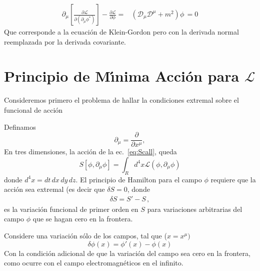 \begin{align}
  \partial_{\mu} \left[ \frac{\partial \mathcal{L}}{\partial \left( \partial_{\mu}\phi^{*} \right)} \right]-\frac{\partial \mathcal{L}}{\partial \phi}=&
 \left(\mathcal{D}_{\mu}\mathcal{D}^{\mu}+m^2  \right)\phi\,=0
\end{align}
Que corresponde a la ecuación de Klein-Gordon pero con la derivada normal reemplazada por la derivada covariante.

\section{Principio de M\'\i nima Acci\'on para $\mathcal{L}$}
\label{sec:principio-de-minima-call}
Consideremos primero el problema de hallar la condiciones extremal sobre el funcional de acción


Definamos
\begin{equation}
  \label{eq:dmu}
  \partial_\mu=\frac{\partial}{\partial x^\mu},
  \end{equation}
En tres dimensiones, la acci\'on de la ec.~\eqref{eq:Scall}, queda
\begin{equation}
  \label{eq:Scall3d}
  S[\phi,\partial_\mu\phi]=\int_{R}d^4x\mathcal{L}(\phi,\partial_\mu\phi)
\end{equation}
donde $d^4x=d t\,d x\, d y\,d z$.  El principio de Hamilton para el campo $\phi$ requiere que la acción sea extremal (es decir que $\delta S=0$, donde
\begin{align}
  \delta S=S'-S\,,
\end{align}
es la variación funcional de primer orden en $S$ para variaciones arbitrarias del campo $\phi$ que se hagan cero en la frontera.

Considere una variaci\'on s\'olo de
los campos, tal que ($x=x^\mu)$
\begin{equation}
  \label{eq:deltaphi}
  \delta\phi(x)=\phi'(x)-\phi(x)
\end{equation}
Con la condición adicional de que la variación del campo sea cero en la frontera, como ocurre con el campo electromagnéticos en el infinito.

